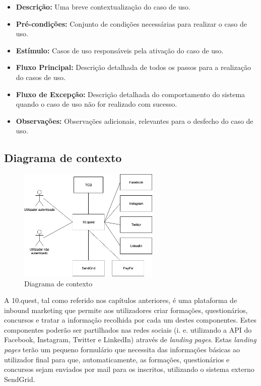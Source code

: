 \begin{itemize}
	\item \textbf{Descrição:} Uma breve contextualização do caso de uso.
	\item \textbf{Pré-condições:} Conjunto de condições necessárias para realizar o caso de uso.
	\item \textbf{Estímulo:} Casos de uso responsáveis pela ativação do caso de uso.
	\item \textbf{Fluxo Principal:} Descrição detalhada de todos os passos para a realização do casos de uso.
	\item \textbf{Fluxo de Excepção:} Descrição detalhada do comportamento do sistema quando o caso de uso não for realizado com sucesso.
	\item \textbf{Observações:} Observações adicionais, relevantes para o desfecho do caso de uso.
\end{itemize}

\newpage

\subsection{Diagrama de contexto}
\label{d:contexto}
\begin{figure}[ht!]
	\begin{center}
		\includegraphics[width=0.6\textwidth]{img/rf/10quest}
		\caption{Diagrama de contexto}
		\label{fig:rf-10quest}
	\end{center}
\end{figure}

A 10.quest, tal como referido nos capítulos anteriores, é uma plataforma de inbound marketing que permite aos utilizadores criar formações, questionários, concursos e tratar a informação recolhida por cada um destes componentes. 
Estes componentes poderão ser partilhados nas redes sociais (i. e. utilizando a API do Facebook, Instagram, Twitter e LinkedIn) através de \textit{landing pages}. Estas \textit{landing pages} terão um pequeno formulário que necessita das informações básicas ao utilizador final para que, automaticamente, as formações, questionários e concursos sejam enviados por mail para os inscritos, utilizando o sistema externo SendGrid.

